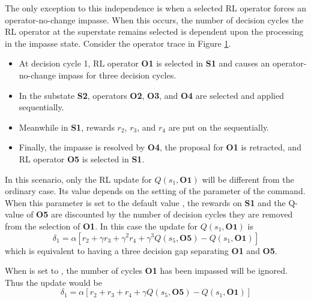 The only exception to this independence is when a selected RL operator forces an operator-no-change impasse.
When this occurs, the number of decision cycles the RL operator at the superstate remains selected is dependent upon the processing in the impasse state.
Consider the operator trace in Figure \ref{fig:rl-optrace}.

\begin{itemize}
	\item At decision cycle 1, RL operator \textbf{O1} is selected in \textbf{S1} and causes an operator-no-change impass for three decision cycles.
	\vspace{-6pt}
	\item In the substate \textbf{S2}, operators \textbf{O2}, \textbf{O3}, and \textbf{O4} are selected and applied sequentially.
	\vspace{-6pt}
	\item Meanwhile in \textbf{S1}, rewards $r_2$, $r_3$, and $r_4$ are put on the  sequentially.
	\vspace{-6pt}
	\item Finally, the impasse is resolved by \textbf{O4}, the proposal for \textbf{O1} is retracted, and RL operator \textbf{O5} is selected in \textbf{S1}.
	\vspace{-6pt}
\end{itemize}

\begin{figure}
	\label{fig:rl-optrace}
\end{figure}

In this scenario, only the RL update for $Q(s_1, \textbf{O1})$ will be different from the ordinary case.
Its value depends on the setting of the  parameter of the  command.
When this parameter is set to the default value , the rewards on \textbf{S1} and the Q-value of \textbf{O5} are discounted by the number of decision cycles they are removed from the selection of \textbf{O1}.
In this case the update for $Q(s_1, \textbf{O1})$ is
$$\delta_1 = \alpha \left[ r_2 + \gamma r_3 + \gamma^2 r_4 + \gamma^3 Q(s_5, \textbf{O5}) - Q(s_1, \textbf{O1}) \right]$$
which is equivalent to having a three decision gap separating \textbf{O1} and \textbf{O5}.

When  is set to , the number of cycles \textbf{O1} has been impassed will be ignored.
Thus the update would be
$$\delta_1 = \alpha \left[ r_2 + r_3 + r_4 + \gamma Q(s_5, \textbf{O5}) - Q(s_1, \textbf{O1}) \right]$$

